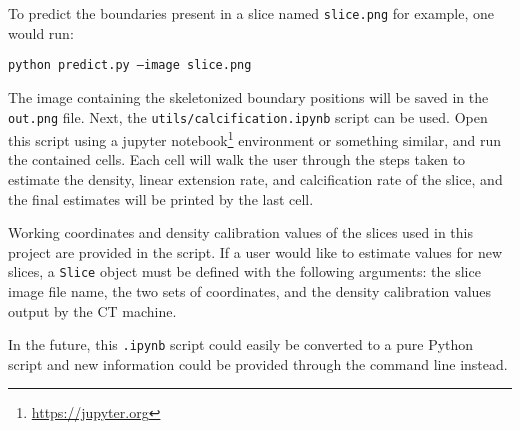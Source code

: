 To predict the boundaries present in a slice named \texttt{slice.png} for example, one would run:

\texttt{python predict.py --image slice.png}

The image containing the skeletonized boundary positions will be saved in the \texttt{out.png} file. Next, the \texttt{utils/calcification.ipynb} script can be used. Open this script using a jupyter notebook\footnote{\url{https://jupyter.org}} environment or something similar, and run the contained cells. Each cell will walk the user through the steps taken to estimate the density, linear extension rate, and calcification rate of the slice, and the final estimates will be printed by the last cell.

Working coordinates and density calibration values of the slices used in this project are provided in the script. If a user would like to estimate values for new slices, a \texttt{Slice} object must be defined with the following arguments: the slice image file name, the two sets of coordinates, and the density calibration values output by the CT machine.

In the future, this \texttt{.ipynb} script could easily be converted to a pure Python script and new information could be provided through the command line instead.
